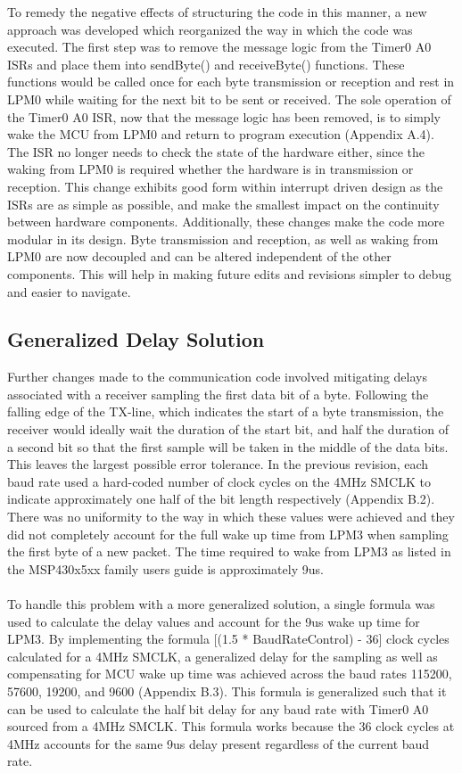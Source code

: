 \documentclass{article}
\begin{document}
To remedy the negative effects of structuring the code in this manner, a new approach was developed which reorganized the way in which the code was executed. The first step was to remove the message logic from the Timer0 A0 ISRs and place them into sendByte() and receiveByte() functions. These functions would be called once for each byte transmission or reception and rest in LPM0 while waiting for the next bit to be sent or received. The sole operation of the Timer0 A0 ISR, now that the message logic has been removed, is to simply wake the MCU from LPM0 and return to program execution (Appendix A.4). The ISR no longer needs to check the state of the hardware either, since the waking from LPM0 is required whether the hardware is in transmission or reception. This change exhibits good form within interrupt driven design as the ISRs are as simple as possible, and make the smallest impact on the continuity between hardware components. Additionally, these changes make the code more modular in its design. Byte transmission and reception, as well as waking from LPM0 are now decoupled and can be altered independent of the other components. This will help in making future edits and revisions simpler to debug and easier to navigate.

\subsection{Generalized Delay Solution}
Further changes made to the communication code involved mitigating delays associated with a receiver sampling the first data bit of a byte. Following the falling edge of the TX-line, which indicates the start of a byte transmission, the receiver would ideally wait the duration of the start bit, and half the duration of a second bit so that the first sample will be taken in the middle of the data bits. This leaves the largest possible error tolerance. In the previous revision, each baud rate used a hard-coded number of clock cycles on the 4MHz SMCLK to indicate approximately one half of the bit length respectively (Appendix B.2). There was no uniformity to the way in which these values were achieved and they did not completely account for the full wake up time from LPM3 when sampling the first byte of a new packet. The time required to wake from LPM3 as listed in the MSP430x5xx family users guide is approximately 9us.
\\\\
To handle this problem with a more generalized solution, a single formula was used to calculate the delay values and account for the 9us wake up time for LPM3. By implementing the formula [(1.5 * BaudRateControl) - 36] clock cycles calculated for a 4MHz SMCLK, a generalized delay for the sampling as well as compensating for MCU wake up time was achieved across the baud rates 115200, 57600, 19200, and 9600 (Appendix B.3). This formula is generalized such that it can be used to calculate the half bit delay for any baud rate with Timer0 A0 sourced from a 4MHz SMCLK. This formula works because the 36 clock cycles at 4MHz accounts for the same 9us delay present regardless of the current baud rate.
\end{document}
